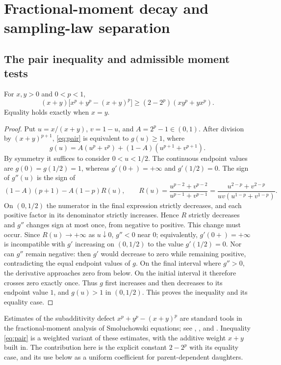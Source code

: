 \section{Fractional-moment decay and sampling-law separation}
\label{sec:fractional}

\subsection{The pair inequality and admissible moment tests}

\begin{lemma}\label{lem:pair}
For $x,y>0$ and $0<p<1$,
\begin{equation}
 (x+y)\bigl[x^p+y^p-(x+y)^p\bigr]
 \geq(2-2^p)(xy^p+yx^p).
 \label{eq:pair}
\end{equation}
Equality holds exactly when $x=y$.
\end{lemma}

\begin{proof}
Put $u=x/(x+y)$, $v=1-u$, and $A=2^p-1\in(0,1)$.
After division by $(x+y)^{p+1}$, \eqref{eq:pair} is equivalent to
$g(u)\geq1$, where
\[
 g(u)=A(u^p+v^p)+(1-A)(u^{p+1}+v^{p+1}).
\]
By symmetry it suffices to consider $0<u<1/2$. The continuous endpoint
values are $g(0)=g(1/2)=1$, whereas $g'(0+)=+\infty$ and $g'(1/2)=0$.
The sign of $g''(u)$ is the sign of
\[
 (1-A)(p+1)-A(1-p)R(u),\qquad
 R(u)=\frac{u^{p-2}+v^{p-2}}{u^{p-1}+v^{p-1}}
     =\frac{u^{2-p}+v^{2-p}}{uv(u^{1-p}+v^{1-p})}.
\]
On $(0,1/2)$ the numerator in the final expression strictly decreases,
and each positive factor in its denominator strictly increases. Hence $R$
strictly decreases and $g''$ changes sign at most once, from negative to
positive. This change must occur. Since $R(u)\to+\infty$ as
$u\downarrow0$, $g''<0$ near $0$; equivalently, $g'(0+)=+\infty$ is
incompatible with $g'$ increasing on $(0,1/2)$ to the value $g'(1/2)=0$.
Nor can $g''$ remain negative: then $g'$ would decrease to zero while
remaining positive, contradicting the equal endpoint values of $g$.
On the final interval where $g''>0$, the derivative approaches zero from
below. On the initial interval it therefore crosses zero exactly once.
Thus $g$ first increases and then decreases to its endpoint value $1$,
and $g(u)>1$ in $(0,1/2)$. This proves the inequality and its equality case.
\end{proof}

Estimates of the subadditivity defect $x^p+y^p-(x+y)^p$ are standard
tools in the fractional-moment analysis of Smoluchowski equations; see
\citet{EscobedoMischlerPerthame2002},
\citet{FournierLaurencot2005,FournierLaurencot2006}, and
\citet{EscobedoMischlerRodriguezRicard2005}. Inequality \eqref{eq:pair}
is a weighted variant of these estimates, with the additive weight $x+y$
built in. The contribution here is the explicit constant $2-2^p$ with its
equality case, and its use below as a uniform coefficient for
parent-dependent daughters.

